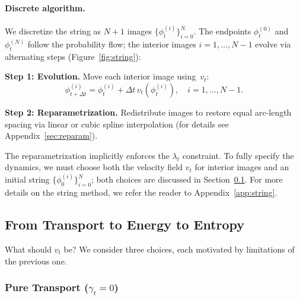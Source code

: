 \documentclass{article}
\theoremstyle{plain}
\theoremstyle{definition}
\theoremstyle{remark}
\begin{document}
\paragraph{Discrete algorithm.} We discretize the string as $N+1$ images $\{\phi_t^{(i)}\}_{i=0}^N$. The endpoints $\phi_t^{(0)}$ and $\phi_t^{(N)}$ follow the probability flow; the interior images $i = 1, \ldots, N-1$ evolve via alternating steps (Figure~\ref{fig:string}):

\textbf{Step 1: Evolution.} Move each interior image using~$v_t$:
\begin{equation}
    \phi_{t+\Delta t}^{(i)} = \phi_t^{(i)} + \Delta t \, v_t(\phi_t^{(i)}), \quad i = 1, \ldots, N-1.
\end{equation}

\textbf{Step 2: Reparametrization.} Redistribute images to restore equal arc-length spacing via linear or cubic spline interpolation (for details see Appendix~\ref{sec:reparam}).

The reparametrization implicitly enforces the $\lambda_t$ constraint. To fully specify the dynamics, we must choose both the velocity field $v_t$ for interior images and an initial string $\{\phi_0^{(i)}\}_{i=0}^N$; both choices are discussed in Section~\ref{sec:three_regimes}. For more details on the string method, we refer the reader to Appendix~\ref{app:string}.


\subsection{From Transport to Energy to Entropy}
\label{sec:three_regimes}

What should $v_t$ be? We consider three choices, each motivated by limitations of the previous one.

\subsubsection{Pure Transport ($\gamma_t = 0$)}
\end{document}
